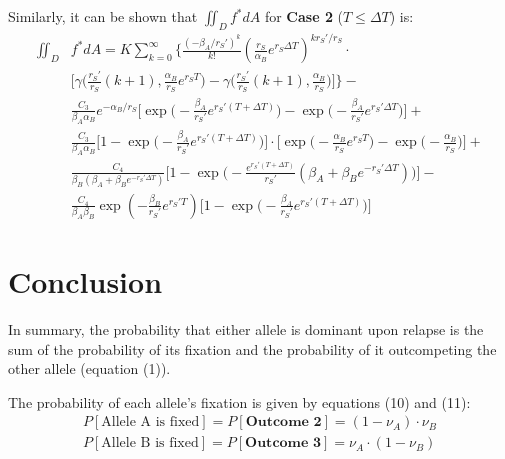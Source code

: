 \documentclass{article}
\begin{document}
Similarly, it can be shown that $\iint_D f^* dA$ for \textbf{Case 2} ($T \leq \Delta T$) is:
\begin{equation}
\begin{split}
\iint_D & f^* dA = K \sum_{k=0}^{\infty} \Bigg\{\frac{(-\beta_A/r_S')^k}{k!} (\frac{r_S}{\alpha_B}e^{r_S \Delta T})^{k r_S'/r_S} \cdot \\
& \Big[\gamma\big(\frac{r_S'}{r_S}(k+1),\frac{\alpha_B}{r_S} e^{r_S T}\big) - \gamma\big(\frac{r_S'}{r_S}(k+1),\frac{\alpha_B}{r_S}\big)\Big]\Bigg\} - \\
&\frac{C_3}{\beta_A \alpha_B} e^{-\alpha_B/r_S} \Big[\exp\Big(-\frac{\beta_A}{r_S'} e^{r_S'(T+\Delta T)}\Big) - \exp\Big(-\frac{\beta_A}{r_S'} e^{r_S' \Delta T}\Big)\Big] +\\ 
&\frac{C_3}{\beta_A \alpha_B}\Big[1 - \exp\Big(-\frac{\beta_A}{r_S'} e^{r_S' (T+\Delta T)}\Big)\Big]\cdot\Big[\exp\Big(-\frac{\alpha_B}{r_S} e^{r_S T}\Big) - \exp\Big(-\frac{\alpha_B}{r_S}\Big)\Big]+\\ 
&\frac{C_4}{\beta_B(\beta_A+\beta_B e^{-r_S' \Delta T})}\Big[1 - \exp\Big(-\frac{e^{r_S'(T+\Delta T)}}{r_S'} (\beta_A + \beta_B e^{-r_S' \Delta T})\Big)\Big] - \\ 
&\frac{C_4}{\beta_A \beta_B} \exp(-\frac{\beta_B}{r_S'} e^{r_S' T})\Big[1 - \exp\Big(-\frac{\beta_A}{r_S'} e^{r_S'(T + \Delta T)}\Big)\Big]
\end{split}
\end{equation}

\section{Conclusion}

In summary, the probability that either allele is dominant upon relapse is the sum of the probability of its fixation and the probability of it outcompeting the other allele (equation (1)).

The probability of each allele's fixation is given by equations (10) and (11):
\begin{equation}
\begin{split}
P[\text{Allele A is fixed}] = P[\textbf{Outcome 2}] = (1 - \nu_A)\cdot\nu_B \\
P[\text{Allele B is fixed}] = P[\textbf{Outcome 3}] = \nu_A \cdot (1 - \nu_B)
\end{split}
\end{equation}
\end{document}
